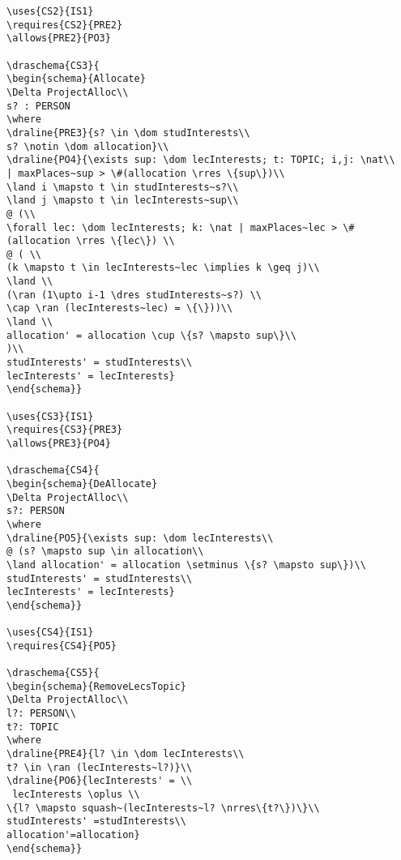 \begin{verbatim}
\uses{CS2}{IS1}
\requires{CS2}{PRE2}
\allows{PRE2}{PO3}

\draschema{CS3}{
\begin{schema}{Allocate}
\Delta ProjectAlloc\\
s? : PERSON
\where
\draline{PRE3}{s? \in \dom studInterests\\
s? \notin \dom allocation}\\
\draline{PO4}{\exists sup: \dom lecInterests; t: TOPIC; i,j: \nat\\
| maxPlaces~sup > \#(allocation \rres \{sup\})\\
\land i \mapsto t \in studInterests~s?\\
\land j \mapsto t \in lecInterests~sup\\
@ (\\
\forall lec: \dom lecInterests; k: \nat | maxPlaces~lec > \# (allocation \rres \{lec\}) \\
@ ( \\
(k \mapsto t \in lecInterests~lec \implies k \geq j)\\
\land \\
(\ran (1\upto i-1 \dres studInterests~s?) \\
\cap \ran (lecInterests~lec) = \{\}))\\
\land \\
allocation' = allocation \cup \{s? \mapsto sup\}\\
)\\
studInterests' = studInterests\\
lecInterests' = lecInterests}
\end{schema}}

\uses{CS3}{IS1}
\requires{CS3}{PRE3}
\allows{PRE3}{PO4}

\draschema{CS4}{
\begin{schema}{DeAllocate}
\Delta ProjectAlloc\\
s?: PERSON
\where
\draline{PO5}{\exists sup: \dom lecInterests\\
@ (s? \mapsto sup \in allocation\\
\land allocation' = allocation \setminus \{s? \mapsto sup\})\\
studInterests' = studInterests\\
lecInterests' = lecInterests}
\end{schema}}

\uses{CS4}{IS1}
\requires{CS4}{PO5}

\draschema{CS5}{
\begin{schema}{RemoveLecsTopic}
\Delta ProjectAlloc\\
l?: PERSON\\
t?: TOPIC
\where
\draline{PRE4}{l? \in \dom lecInterests\\
t? \in \ran (lecInterests~l?)}\\
\draline{PO6}{lecInterests' = \\
 lecInterests \oplus \\
\{l? \mapsto squash~(lecInterests~l? \nrres\{t?\})\}\\
studInterests' =studInterests\\
allocation'=allocation}
\end{schema}}


\end{verbatim}
